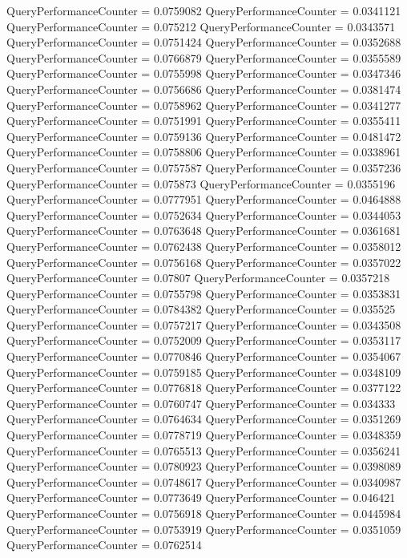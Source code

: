 \documentclass[9pt]{article}
\theoremstyle{plain}
\theoremstyle{definition}
\theoremstyle{remark}
\numberwithin{equation}{section}
\begin{document}
QueryPerformanceCounter  =  0.0759082
QueryPerformanceCounter  =  0.0341121
QueryPerformanceCounter  =  0.075212
QueryPerformanceCounter  =  0.0343571
QueryPerformanceCounter  =  0.0751424
QueryPerformanceCounter  =  0.0352688
QueryPerformanceCounter  =  0.0766879
QueryPerformanceCounter  =  0.0355589
QueryPerformanceCounter  =  0.0755998
QueryPerformanceCounter  =  0.0347346
QueryPerformanceCounter  =  0.0756686
QueryPerformanceCounter  =  0.0381474
QueryPerformanceCounter  =  0.0758962
QueryPerformanceCounter  =  0.0341277
QueryPerformanceCounter  =  0.0751991
QueryPerformanceCounter  =  0.0355411
QueryPerformanceCounter  =  0.0759136
QueryPerformanceCounter  =  0.0481472
QueryPerformanceCounter  =  0.0758806
QueryPerformanceCounter  =  0.0338961
QueryPerformanceCounter  =  0.0757587
QueryPerformanceCounter  =  0.0357236
QueryPerformanceCounter  =  0.075873
QueryPerformanceCounter  =  0.0355196
QueryPerformanceCounter  =  0.0777951
QueryPerformanceCounter  =  0.0464888
QueryPerformanceCounter  =  0.0752634
QueryPerformanceCounter  =  0.0344053
QueryPerformanceCounter  =  0.0763648
QueryPerformanceCounter  =  0.0361681
QueryPerformanceCounter  =  0.0762438
QueryPerformanceCounter  =  0.0358012
QueryPerformanceCounter  =  0.0756168
QueryPerformanceCounter  =  0.0357022
QueryPerformanceCounter  =  0.07807
QueryPerformanceCounter  =  0.0357218
QueryPerformanceCounter  =  0.0755798
QueryPerformanceCounter  =  0.0353831
QueryPerformanceCounter  =  0.0784382
QueryPerformanceCounter  =  0.035525
QueryPerformanceCounter  =  0.0757217
QueryPerformanceCounter  =  0.0343508
QueryPerformanceCounter  =  0.0752009
QueryPerformanceCounter  =  0.0353117
QueryPerformanceCounter  =  0.0770846
QueryPerformanceCounter  =  0.0354067
QueryPerformanceCounter  =  0.0759185
QueryPerformanceCounter  =  0.0348109
QueryPerformanceCounter  =  0.0776818
QueryPerformanceCounter  =  0.0377122
QueryPerformanceCounter  =  0.0760747
QueryPerformanceCounter  =  0.034333
QueryPerformanceCounter  =  0.0764634
QueryPerformanceCounter  =  0.0351269
QueryPerformanceCounter  =  0.0778719
QueryPerformanceCounter  =  0.0348359
QueryPerformanceCounter  =  0.0765513
QueryPerformanceCounter  =  0.0356241
QueryPerformanceCounter  =  0.0780923
QueryPerformanceCounter  =  0.0398089
QueryPerformanceCounter  =  0.0748617
QueryPerformanceCounter  =  0.0340987
QueryPerformanceCounter  =  0.0773649
QueryPerformanceCounter  =  0.046421
QueryPerformanceCounter  =  0.0756918
QueryPerformanceCounter  =  0.0445984
QueryPerformanceCounter  =  0.0753919
QueryPerformanceCounter  =  0.0351059
QueryPerformanceCounter  =  0.0762514
\end{document}
